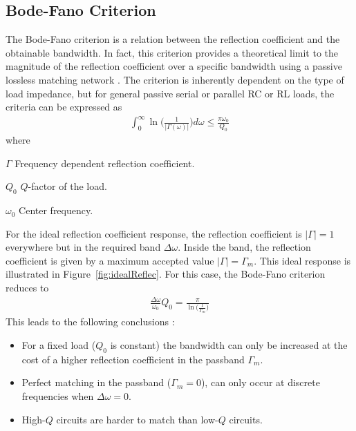 \subsection{Bode-Fano Criterion}
The Bode-Fano criterion is a relation between the reflection coefficient and the obtainable bandwidth. In fact, this criterion provides a theoretical limit to the magnitude of the reflection coefficient over a specific bandwidth using a passive lossless matching network \cite{pozar2011microwave}. The criterion is inherently dependent on the type of load impedance, but for general passive serial or parallel RC or RL loads, the criteria can be expressed as \cite{RahulSarpeshkarUltra}
\begin{align}
  \int_0^{\infty} \ln \Big( \frac{1}{|\Gamma (\omega)|} \Big) d\omega \leq \frac{\pi \omega_0}{Q_0}
\end{align}
where
\begin{where}
\item[$\Gamma$] Frequency dependent reflection coefficient.
\item[$Q_0$] $Q$-factor of the load.
\item[$\omega_0$] Center frequency.
\end{where}
For the ideal reflection coefficient response, the reflection coefficient is $|\Gamma|=1$ everywhere but in the required band $\Delta \omega$. Inside the band, the reflection coefficient is given by a maximum accepted value $|\Gamma|=\Gamma_{m}$. This ideal response is illustrated in Figure~\ref{fig:idealReflec}. For this case, the Bode-Fano criterion reduces to \cite{AntennaswithNonFosterMatchingNetworks}
\begin{align}
  \frac{\Delta \omega}{\omega_0} Q_0 = \frac{\pi}{\ln \big(\frac{1}{\Gamma_m} \big)}
\end{align}
This leads to the following conclusions \cite{pozar2011microwave}:
\begin{itemize}
\item For a fixed load ($Q_0$ is constant) the bandwidth can only be increased at the cost of a higher reflection coefficient in the passband $\Gamma_m$.
\item Perfect matching in the passband ($\Gamma_m = 0$), can only occur at discrete frequencies when $\Delta \omega = 0$.
\item High-$Q$ circuits are harder to match than low-$Q$ circuits.
\end{itemize}

